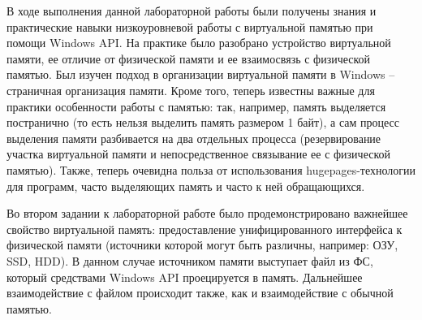 \documentclass[a4paper,14pt]{extarticle}
\begin{document}

\clearpage


В ходе выполнения данной лабораторной работы были получены знания и практические навыки
низкоуровневой работы с виртуальной памятью при помощи Windows API. На практике
было разобрано устройство виртуальной памяти, ее отличие от физической памяти
и ее взаимосвязь с физической памятью. Был изучен подход в организации
виртуальной памяти в Windows -- страничная организация памяти. Кроме того,
теперь известны важные для практики особенности работы с памятью: так, например,
память выделяется постранично (то есть нельзя выделить память размером 1 байт),
а сам процесс выделения памяти разбивается на два отдельных процесса
(резервирование участка виртуальной памяти и непосредственное связывание ее с
физической памятью). Также, теперь очевидна польза от использования
hugepages-технологии для программ, часто выделяющих память и часто к ней
обращающихся.

Во втором задании к лабораторной работе было продемонстрировано важнейшее
свойство виртуальной память: предоставление унифицированного интерфейса к
физической памяти (источники которой могут быть различны, например: ОЗУ, SSD,
HDD). В данном случае источником памяти выступает файл из ФС, который
средствами Windows API проецируется в память. Дальнейшее взаимодействие с
файлом происходит также, как и взаимодействие с обычной памятью.
\end{document}

